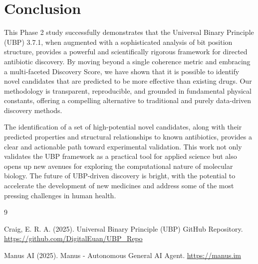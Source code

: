 \documentclass[12pt, a4paper]{article}
\begin{document}
\section{Conclusion}

This Phase 2 study successfully demonstrates that the Universal Binary Principle (UBP) 3.7.1, when augmented with a sophisticated analysis of bit position structure, provides a powerful and scientifically rigorous framework for directed antibiotic discovery. By moving beyond a single coherence metric and embracing a multi-faceted Discovery Score, we have shown that it is possible to identify novel candidates that are predicted to be more effective than existing drugs. Our methodology is transparent, reproducible, and grounded in fundamental physical constants, offering a compelling alternative to traditional and purely data-driven discovery methods.

The identification of a set of high-potential novel candidates, along with their predicted properties and structural relationships to known antibiotics, provides a clear and actionable path toward experimental validation. This work not only validates the UBP framework as a practical tool for applied science but also opens up new avenues for exploring the computational nature of molecular biology. The future of UBP-driven discovery is bright, with the potential to accelerate the development of new medicines and address some of the most pressing challenges in human health.

\begin{thebibliography}{9}

Craig, E. R. A. (2025). Universal Binary Principle (UBP) GitHub Repository. \url{https://github.com/DigitalEuan/UBP_Repo}

Manus AI (2025). Manus - Autonomous General AI Agent. \url{https://manus.im}

\end{thebibliography}
\end{document}
